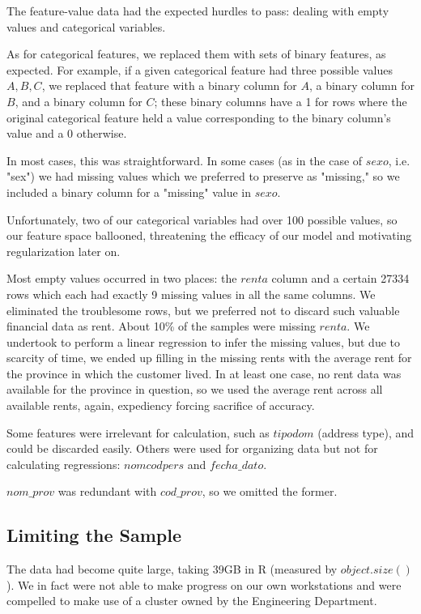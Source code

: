 \documentclass{report}
\begin{document}
The feature-value data had the expected hurdles to pass: dealing with empty values and categorical variables.

As for categorical features, we replaced them with sets of binary features, as expected. For example, if a given categorical feature had three possible values ${A,B,C}$, we replaced that feature with a binary column for $A$, a binary column for $B$, and a binary column for $C$; these binary columns have a 1 for rows where the original categorical feature held a value corresponding to the binary column's value and a 0 otherwise.

In most cases, this was straightforward. In some cases (as in the case of $sexo$, i.e. "sex") we had missing values which we preferred to preserve as "missing," so we included a binary column for a "missing" value in $sexo$.

Unfortunately, two of our categorical variables had over 100 possible values, so our feature space ballooned, threatening the efficacy of our model and motivating regularization later on.

Most empty values occurred in two places: the $renta$ column and a certain 27334 rows which each had exactly 9 missing values in all the same columns. We eliminated the troublesome rows, but we preferred not to discard such valuable financial data as rent. About 10\% of the samples were missing $renta$. We undertook to perform a linear regression to infer the missing values, but due to scarcity of time, we ended up filling in the missing rents with the average rent for the province in which the customer lived. In at least one case, no rent data was available for the province in question, so we used the average rent across all available rents, again, expediency forcing sacrifice of accuracy.

Some features were irrelevant for calculation, such as $tipodom$ (address type), and could be discarded easily. Others were used for organizing data but not for calculating regressions: $nomcodpers$ and $fecha\_dato$.

$nom\_prov$ was redundant with $cod\_prov$, so we omitted the former.

\subsection{Limiting the Sample}

The data had become quite large, taking 39GB in R (measured by $object.size()$). We in fact were not able to make progress on our own workstations and were compelled to make use of a cluster owned by the Engineering Department.
\end{document}
